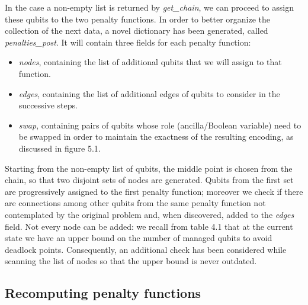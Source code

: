 In the case a non-empty list is returned by \textit{get\_chain}, we can proceed to assign these qubits to the two penalty functions. In order to better organize the collection of the next data, a novel dictionary has been generated, called \textit{penalties\_post}. It will contain three fields for each penalty function:

\begin{itemize}
    \item \textit{nodes}, containing the list of additional qubits that we will assign to that function.
    \item \textit{edges}, containing the list of additional edges of qubits to consider in the successive steps.
    \item \textit{swap}, containing pairs of qubits whose role (ancilla/Boolean variable) need to be swapped in order to maintain the exactness of the resulting encoding, as discussed in figure 5.1.
\end{itemize}

Starting from the non-empty list of qubits, the middle point is chosen from the chain, so that two disjoint sets of nodes are generated. Qubits from the first set are progressively assigned to the first penalty function; moreover we check if there are connections among other qubits from the same penalty function not contemplated by the original problem and, when discovered, added to the \textit{edges} field. Not every node can be added: we recall from table 4.1 that at the current state we have an upper bound on the number of managed qubits to avoid deadlock points. Consequently, an additional check has been considered while scanning the list of nodes so that the upper bound is never outdated.

\subsection{Recomputing penalty functions}

